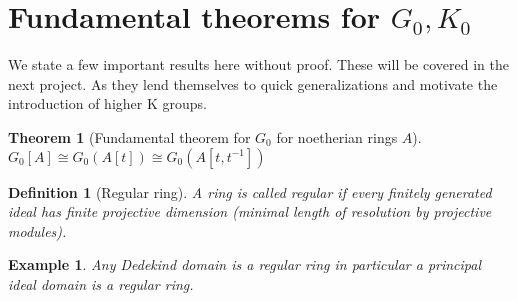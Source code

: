 \documentclass[12pt]{report}
\numberwithin{equation}{section}
\newcounter{dummy} \numberwithin{dummy}{section}
\newtheorem{theorem}[dummy]{Theorem}
\newtheorem{definition}[dummy]{Definition}
\newtheorem{example}[dummy]{Example}
\begin{document}
	\section{Fundamental theorems for $G_0, K_0$}
	We state a few important results here without proof. These will be covered in the next project. As they lend themselves to quick generalizations and motivate the introduction of higher K groups.
	\begin{theorem}[Fundamental theorem for $G_0$ for noetherian rings $A$]\label{g0fund}
		$G_0[A] \cong G_0(A[t]) \cong G_0(A[t,t^{-1}])$
	\end{theorem}
%
%		
	
	
	\begin{definition}[Regular ring] A ring is called regular if every finitely generated ideal has finite projective dimension (minimal length of resolution by projective modules).
	\end{definition}
	\begin{example}
		Any Dedekind domain is a regular ring in particular a principal ideal domain is a regular ring.
	\end{example}
\end{document}
